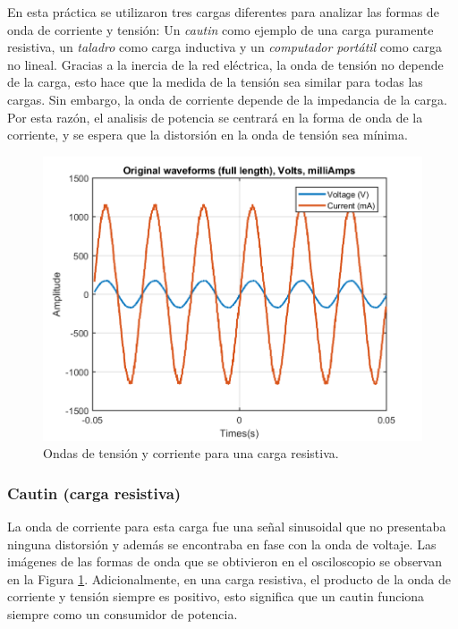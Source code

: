 \documentclass[journal]{IEEEtran}
\begin{document}
En esta práctica se utilizaron tres cargas diferentes 
para analizar las formas de onda de corriente y tensión: 
Un \textit{cautin} como ejemplo de una carga puramente 
resistiva, un \textit{taladro} como carga inductiva y un 
\textit{computador portátil} como carga no lineal. 
Gracias a la inercia de la red eléctrica, la onda de 
tensión no depende de la carga, esto hace que la medida de 
la tensión sea similar para todas las cargas. Sin embargo, 
la onda de corriente depende de la impedancia de la carga. 
Por esta razón, el analisis de potencia se centrará 
en la forma de onda de la corriente, y se espera que 
la distorsión en la onda de tensión sea mínima. 

\begin{figure}[h]
\centering
\includegraphics[clip,width=0.9\columnwidth]{original_waveform_cautin.png}
\caption{Ondas de tensión y corriente para una carga
resistiva.}
\label{original_resistive_load}
\end{figure}

\subsubsection{Cautin (carga resistiva)}
La onda de corriente para esta carga fue una señal 
sinusoidal que no presentaba ninguna distorsión y además 
se encontraba en fase con la onda de voltaje. Las imágenes
de las formas de onda que se obtivieron en el osciloscopio 
se observan en la Figura \ref{original_resistive_load}. 
Adicionalmente, en una carga resistiva, el producto de la 
onda de corriente y tensión siempre es positivo, esto 
significa que un cautin funciona siempre como un 
consumidor de potencia. \\
\end{document}
